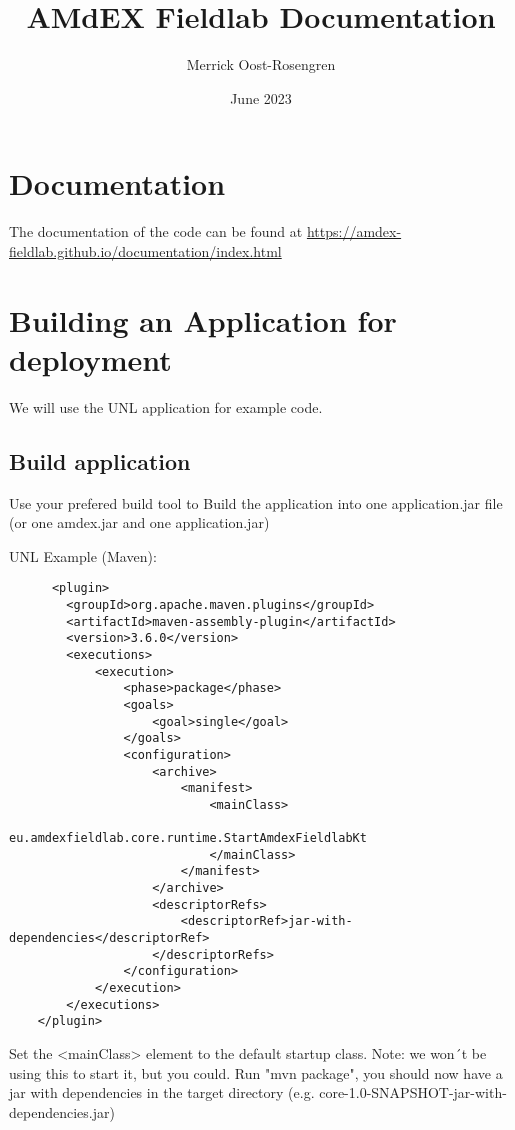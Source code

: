 \documentclass{article}
\title{AMdEX Fieldlab Documentation}
\author{Merrick Oost-Rosengren}
\date{June 2023}
\begin{document}
\maketitle

\section{Documentation}
The documentation of the code can be found at \url{https://amdex-fieldlab.github.io/documentation/index.html}

\section{Building an Application for deployment}
We will use the UNL application for example code.
\subsection{Build application}
Use your prefered build tool to Build the application into one application.jar file (or one amdex.jar and one application.jar)

UNL Example (Maven):
\begin{verbatim}
      <plugin>
        <groupId>org.apache.maven.plugins</groupId>
        <artifactId>maven-assembly-plugin</artifactId>
        <version>3.6.0</version>
        <executions>
            <execution>
                <phase>package</phase>
                <goals>
                    <goal>single</goal>
                </goals>
                <configuration>
                    <archive>
                        <manifest>
                            <mainClass>
                                eu.amdexfieldlab.core.runtime.StartAmdexFieldlabKt
                            </mainClass>
                        </manifest>
                    </archive>
                    <descriptorRefs>
                        <descriptorRef>jar-with-dependencies</descriptorRef>
                    </descriptorRefs>
                </configuration>
            </execution>
        </executions>
    </plugin>
\end{verbatim}
Set the <mainClass> element to the default startup class. Note: we won´t be using this to start it, but you could.
Run "mvn package", you should now have a jar with dependencies in the target directory (e.g. core-1.0-SNAPSHOT-jar-with-dependencies.jar)
\end{document}
